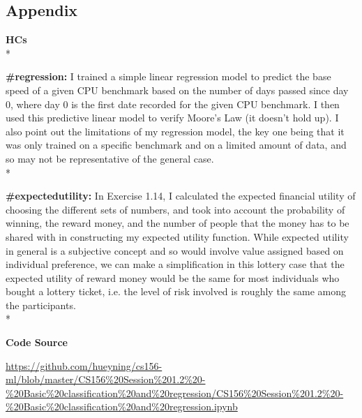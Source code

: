 \documentclass[11pt]{article}
\def\br{\hspace*{\fill} \\* }
\begin{document}
    \subsection*{Appendix}

\textbf{HCs}\br

\textbf{\#regression:} I trained a simple linear regression model to predict the
base speed of a given CPU benchmark based on the number of days passed
since day 0, where day 0 is the first date recorded for the given CPU
benchmark. I then used this predictive linear model to verify Moore's
Law (it doesn't hold up). I also point out the limitations of my
regression model, the key one being that it was only trained on a
specific benchmark and on a limited amount of data, and so may not be
representative of the general case.\br

\textbf{\#expectedutility:} In Exercise 1.14, I calculated the expected financial
utility of choosing the different sets of numbers, and took into account
the probability of winning, the reward money, and the number of people
that the money has to be shared with in constructing my expected utility
function. While expected utility in general is a subjective concept and
so would involve value assigned based on individual preference, we can
make a simplification in this lottery case that the expected utility of
reward money would be the same for most individuals who bought a lottery
ticket, i.e. the level of risk involved is roughly the same among the
participants.\br

\textbf{Code Source}

\url{https://github.com/hueyning/cs156-ml/blob/master/CS156\%20Session\%201.2\%20-\%20Basic\%20classification\%20and\%20regression/CS156\%20Session\%201.2\%20-\%20Basic\%20classification\%20and\%20regression.ipynb}


    
    
    
    
\end{document}
